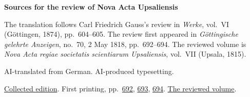 \clearpage\thispagestyle{empty}
\begin{center}\Large\bfseries Sources for the review of Nova Acta Upsaliensis\end{center}

The translation follows Carl Friedrich Gauss’s review in \emph{Werke}, vol.~VI (Göttingen, 1874), pp.~604--605. The review first appeared in \emph{Göttingische gelehrte Anzeigen}, no.~70, 2 May 1818, pp.~692--694. The reviewed volume is \emph{Nova Acta regiae societatis scientiarum Upsaliensis}, vol.~VII (Upsala, 1815).

AI-translated from German. AI-produced typesetting.

\href{https://gdz.sub.uni-goettingen.de/id/PPN236007467}{Collected edition}. First printing, pp.~\href{https://images.p.sub.uni-goettingen.de/iiif/image/gdz:PPN319721507_1818:00000700/full/1650,/0/default.jpg}{692}, \href{https://images.p.sub.uni-goettingen.de/iiif/image/gdz:PPN319721507_1818:00000701/full/1650,/0/default.jpg}{693}, \href{https://images.p.sub.uni-goettingen.de/iiif/image/gdz:PPN319721507_1818:00000702/full/1650,/0/default.jpg}{694}. \href{https://play.google.com/store/books/details/Nova_acta_regiae_societatis_scientiarum_upsaliensi?id=QakWAAAAQAAJ}{The reviewed volume}.

\clearpage
